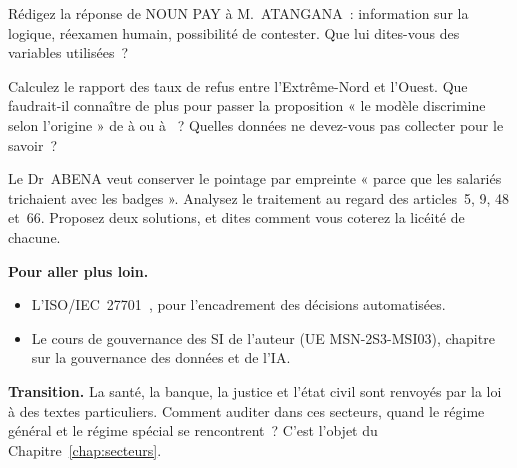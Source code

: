 \begin{boxexo}[title={\ding{45}\quad Exercice~14.2. Répondre à M. ATANGANA \niveaumoyen}]
Rédigez la réponse de NOUN PAY à M.~ATANGANA~: information sur la logique,
réexamen humain, possibilité de contester. Que lui dites-vous des variables
utilisées~?
\end{boxexo}

\begin{boxexo}[title={\ding{45}\quad Exercice~14.3. Les taux de refus \niveaumoyen}]
Calculez le rapport des taux de refus entre l'Extrême-Nord et l'Ouest. Que
faudrait-il connaître de plus pour passer la proposition « le modèle
discrimine selon l'origine » de \NEK{} à \OUI{} ou à \NON{}~? Quelles
données ne devez-vous pas collecter pour le savoir~?
\end{boxexo}

\begin{boxexo}[title={\ding{45}\quad Exercice~14.4. Le pointage biométrique \niveauexpert}]
Le Dr~ABENA veut conserver le pointage par empreinte « parce que les
salariés trichaient avec les badges ». Analysez le traitement au regard des
articles~5, 9, 48 et~66. Proposez deux solutions, et dites comment vous
coterez la licéité de chacune.
\end{boxexo}

\bigskip

\begin{boxinfo}
\textbf{Pour aller plus loin.}
\begin{itemize}
    \item L'ISO/IEC~27701~\cite{iso27701}, pour l'encadrement des
          décisions automatisées.
    \item Le cours de gouvernance des SI de l'auteur (UE MSN-2S3-MSI03),
          chapitre sur la gouvernance des données et de l'IA.
\end{itemize}
\end{boxinfo}

\begin{boxinfo}
\textbf{Transition.} La santé, la banque, la justice et l'état civil sont
renvoyés par la loi à des textes particuliers. Comment auditer dans ces
secteurs, quand le régime général et le régime spécial se rencontrent~?
C'est l'objet du Chapitre~\ref{chap:secteurs}.
\end{boxinfo}
